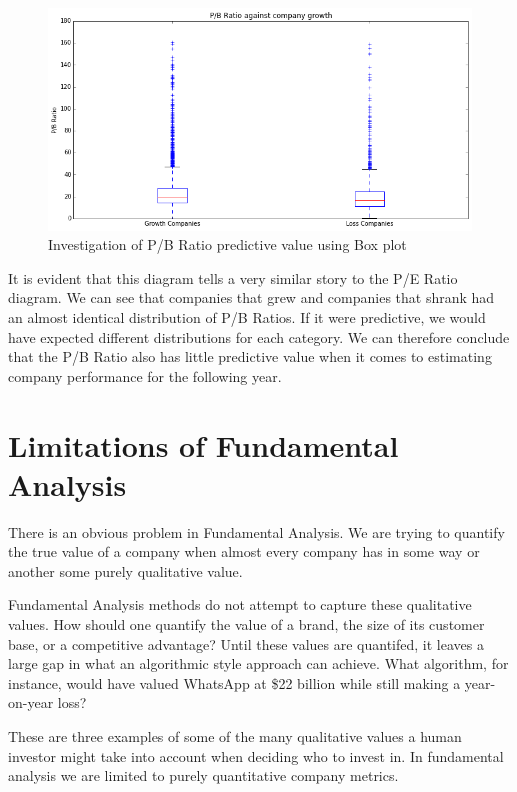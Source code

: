 \documentclass{report}
\begin{document}
\begin{figure}[H]
	\caption{Investigation of P/B Ratio predictive value using Box plot}
	\centerline{\includegraphics[width=\textwidth]{vis/pb_box.png}}
	\label{fig:pb-box}
\end{figure}

It is evident that this diagram tells a very similar story to the P/E Ratio diagram. We can see that companies that grew and companies that shrank had an almost identical distribution of P/B Ratios. If it were predictive, we would have expected different distributions for each category. We can therefore conclude that the P/B Ratio also has little predictive value when it comes to estimating company performance for the following year.

\section{Limitations of Fundamental Analysis}

There is an obvious problem in Fundamental Analysis. We are trying to quantify the true value of a company when almost every company has in some way or another some purely qualitative value.

Fundamental Analysis methods do not attempt to capture these qualitative values. How should one quantify the value of a brand, the size of its customer base, or a competitive advantage? Until these values are quantifed, it leaves a large gap in what an algorithmic style approach can achieve. What algorithm, for instance, would have valued WhatsApp at \$22 billion while still making a year-on-year loss? \cite{whatsapp}

These are three examples of some of the many qualitative values a human investor might take into account when deciding who to invest in. In fundamental analysis we are limited to purely quantitative company metrics.
\end{document}
